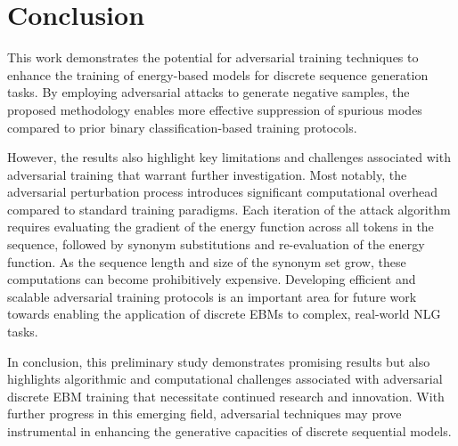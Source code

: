 \documentclass[11pt]{article}
\begin{document}
\section{Conclusion}

This work demonstrates the potential for adversarial training techniques to enhance the training of energy-based models for discrete sequence generation tasks. By employing adversarial attacks to generate negative samples, the proposed methodology enables more effective suppression of spurious modes compared to prior binary classification-based training protocols.

However, the results also highlight key limitations and challenges associated with adversarial training that warrant further investigation. Most notably, the adversarial perturbation process introduces significant computational overhead compared to standard training paradigms. Each iteration of the attack algorithm requires evaluating the gradient of the energy function across all tokens in the sequence, followed by synonym substitutions and re-evaluation of the energy function. As the sequence length and size of the synonym set grow, these computations can become prohibitively expensive.
Developing efficient and scalable adversarial training protocols is an important area for future work towards enabling the application of discrete EBMs to complex, real-world NLG tasks.

In conclusion, this preliminary study demonstrates promising results but also highlights algorithmic and computational challenges associated with adversarial discrete EBM training that necessitate continued research and innovation. With further progress in this emerging field, adversarial techniques may prove instrumental in enhancing the generative capacities of discrete sequential models.



\end{document}
